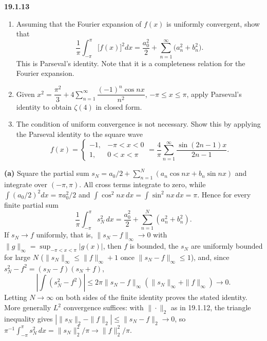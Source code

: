 \par\bigskip
\noindent\textbf{19.1.13}
\begin{enumerate}
\item[(a)] Assuming that the Fourier expansion of  $f(x)$ is
uniformly convergent, show that
\[
\frac{1}{\pi}\int_{-\pi}^{\pi}\big[f(x)\big]^{2}dx
=\frac{a_{0}^{2}}{2}+\sum_{n=1}^{\infty}\big(a_{n}^{2}+b_{n}^{2}\big).
\]
This is Parseval's identity. Note that it is a completeness
relation for the Fourier expansion.
\item[(b)] Given
$x^{2}=\dfrac{\pi^{2}}{3}+4\displaystyle\sum_{n=1}^{\infty}
\dfrac{(-1)^{n}\cos nx}{n^{2}}$, $-\pi\le x\le\pi$, apply
Parseval's identity to obtain $\zeta(4)$ in closed form.
\item[(c)] The condition of uniform convergence is not necessary.
Show this by applying the Parseval identity to the square wave
\[
f(x)=\begin{cases}-1,&-\pi<x<0\\1,&0<x<\pi\end{cases}
=\frac{4}{\pi}\sum_{n=1}^{\infty}\frac{\sin(2n-1)x}{2n-1}.
\]
\end{enumerate}
\solution
\textbf{(a)} Square the partial sum
$s_N=a_0/2+\sum_{n=1}^N(a_n\cos nx+b_n\sin nx)$ and integrate over
$(-\pi,\pi)$. All cross terms integrate to zero, while
$\int(a_0/2)^2dx=\pi a_0^2/2$ and
$\int\cos^2nx\,dx=\int\sin^2nx\,dx=\pi$. Hence for every finite partial
sum
\[
\frac1\pi\int_{-\pi}^{\pi}s_N^2\,dx
=\frac{a_0^2}{2}+\sum_{n=1}^N(a_n^2+b_n^2).
\]
If $s_N\to f$ uniformly, that is, $\|s_N-f\|_\infty\to0$ with
$\|g\|_\infty=\sup_{-\pi<x<\pi}|g(x)|$, then $f$ is bounded, the $s_N$
are uniformly bounded for large $N$ ($\|s_N\|_\infty\le\|f\|_\infty+1$
once $\|s_N-f\|_\infty\le1$), and, since $s_N^2-f^2=(s_N-f)(s_N+f)$,
\[
\left|\int(s_N^2-f^2)\right|
\le2\pi\|s_N-f\|_\infty(\|s_N\|_\infty+\|f\|_\infty)\longrightarrow0.
\]
Letting $N\to\infty$ on both sides of the finite identity proves the
stated identity.
More generally $L^2$ convergence suffices: with $\|\cdot\|_2$ as in
19.1.12, the triangle inequality gives
$|\|s_N\|_2-\|f\|_2|\le\|s_N-f\|_2\to0$, so
$\pi^{-1}\int_{-\pi}^{\pi}s_N^2\,dx=\|s_N\|_2^2/\pi\to\|f\|_2^2/\pi$.

